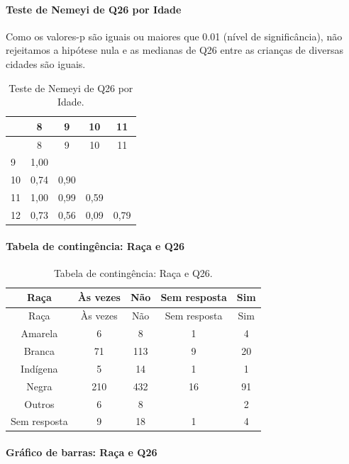 \documentclass[]{article}
\let\oldparagraph\paragraph
\renewcommand{\paragraph}[1]{\oldparagraph{#1}\mbox{}}
\begin{document}
\hypertarget{teste-de-nemeyi-de-q26-por-idade}{%
\paragraph{Teste de Nemeyi de Q26 por Idade}\label{teste-de-nemeyi-de-q26-por-idade}}

Como os valores-p são iguais ou maiores que 0.01 (nível de significância), não rejeitamos a hipótese nula e as medianas de Q26 entre as crianças de diversas cidades são iguais.

\begin{longtable}[]{@{}lcccc@{}}
\caption{\label{tab:unnamed-chunk-749}Teste de Nemeyi de Q26 por Idade.}\tabularnewline
\toprule
& 8 & 9 & 10 & 11\tabularnewline
\midrule
\endfirsthead
\toprule
& 8 & 9 & 10 & 11\tabularnewline
\midrule
\endhead
9 & 1,00 & & &\tabularnewline
10 & 0,74 & 0,90 & &\tabularnewline
11 & 1,00 & 0,99 & 0,59 &\tabularnewline
12 & 0,73 & 0,56 & 0,09 & 0,79\tabularnewline
\bottomrule
\end{longtable}

\cleardoublepage

\hypertarget{tabela-de-continguxeancia-rauxe7a-e-q26}{%
\paragraph{Tabela de contingência: Raça e Q26}\label{tabela-de-continguxeancia-rauxe7a-e-q26}}

\begin{longtable}[]{@{}ccccc@{}}
\caption{\label{tab:unnamed-chunk-750}Tabela de contingência: Raça e Q26.}\tabularnewline
\toprule
Raça & Às vezes & Não & Sem resposta & Sim\tabularnewline
\midrule
\endfirsthead
\toprule
Raça & Às vezes & Não & Sem resposta & Sim\tabularnewline
\midrule
\endhead
Amarela & 6 & 8 & 1 & 4\tabularnewline
Branca & 71 & 113 & 9 & 20\tabularnewline
Indígena & 5 & 14 & 1 & 1\tabularnewline
Negra & 210 & 432 & 16 & 91\tabularnewline
Outros & 6 & 8 & & 2\tabularnewline
Sem resposta & 9 & 18 & 1 & 4\tabularnewline
\bottomrule
\end{longtable}

\hypertarget{gruxe1fico-de-barras-rauxe7a-e-q26}{%
\paragraph{Gráfico de barras: Raça e Q26}\label{gruxe1fico-de-barras-rauxe7a-e-q26}}
\end{document}
